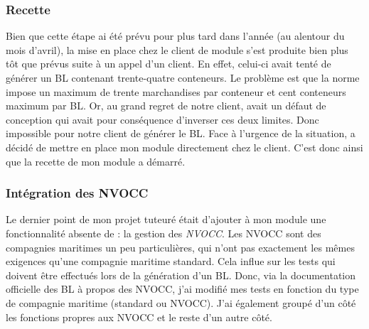\subsubsection{Recette}
Bien que cette étape ai été prévu pour plus tard dans l'année (au alentour du mois d'avril), la mise en place chez le client de module s'est produite bien plus tôt que prévus suite à un appel d'un client. En effet, celui-ci avait tenté de générer un BL contenant trente-quatre conteneurs. Le problème est que la norme impose un maximum de trente marchandises par conteneur et cent conteneurs maximum par BL. Or, au grand regret de notre client, \pireus{} avait un défaut de conception qui avait pour conséquence d'inverser ces deux limites. Donc impossible pour notre client de générer le BL. Face à l'urgence de la situation, \solulog{} a décidé de mettre en place mon module directement chez le client. C'est donc ainsi que la recette de mon module a démarré.

\subsubsection{Intégration des NVOCC}
Le dernier point de mon projet tuteuré était d'ajouter à mon module une fonctionnalité absente de \pireus{} : la gestion des \emph{NVOCC}. Les NVOCC sont des compagnies maritimes un peu particulières, qui n'ont pas exactement les mêmes exigences qu'une compagnie maritime standard. Cela influe sur les tests qui doivent être effectués lors de la génération d'un BL. Donc, via la documentation officielle des BL à propos des NVOCC, j'ai modifié mes tests en fonction du type de compagnie maritime (standard ou NVOCC). J'ai également groupé d'un côté les fonctions propres aux NVOCC et le reste d'un autre côté.
